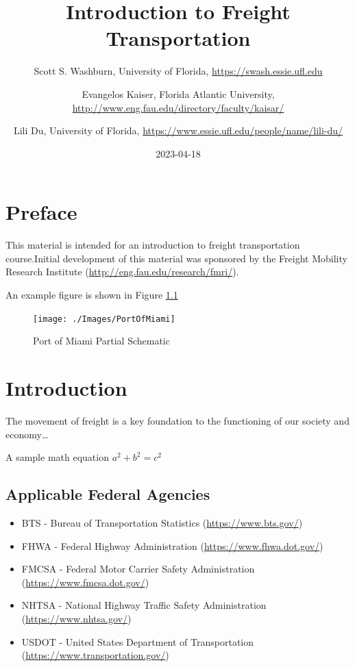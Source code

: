 \documentclass[
]{book}
\title{Introduction to Freight Transportation}
\author{Scott S. Washburn, University of Florida, \url{https://swash.essie.ufl.edu} \and Evangelos Kaiser, Florida Atlantic University, \url{http://www.eng.fau.edu/directory/faculty/kaisar/} \and Lili Du, University of Florida, \url{https://www.essie.ufl.edu/people/name/lili-du/}}
\date{2023-04-18}
\providecommand{\tightlist}{%
  \setlength{\itemsep}{0pt}\setlength{\parskip}{0pt}}
\begin{document}
\maketitle

{
\setcounter{tocdepth}{1}
\tableofcontents
}
\hypertarget{preface}{%
\chapter{Preface}\label{preface}}

This material is intended for an introduction to freight transportation course.Initial development of this material was sponsored by the Freight Mobility Research Institute (\url{http://eng.fau.edu/research/fmri/}).

An example figure is shown in Figure \ref{fig:PortImage}

\begin{figure}

{\centering \texttt{[image: ./Images/PortOfMiami]} 

}

\caption{Port of Miami Partial Schematic}\label{fig:PortImage}
\end{figure}

\hypertarget{intro}{%
\chapter{Introduction}\label{intro}}

The movement of freight is a key foundation to the functioning of our society and economy\ldots{}

A sample math equation \(a^2 + b^2 = c^2\)

\hypertarget{intro-agencies}{%
\section{Applicable Federal Agencies}\label{intro-agencies}}

\begin{itemize}
\tightlist
\item
  BTS - Bureau of Transportation Statistics (\url{https://www.bts.gov/})
\item
  FHWA - Federal Highway Administration (\url{https://www.fhwa.dot.gov/})
\item
  FMCSA - Federal Motor Carrier Safety Administration (\url{https://www.fmcsa.dot.gov/})
\item
  NHTSA - National Highway Traffic Safety Administration (\url{https://www.nhtsa.gov/})
\item
  USDOT - United States Department of Transportation (\url{https://www.transportation.gov/})
\end{itemize}
\end{document}
